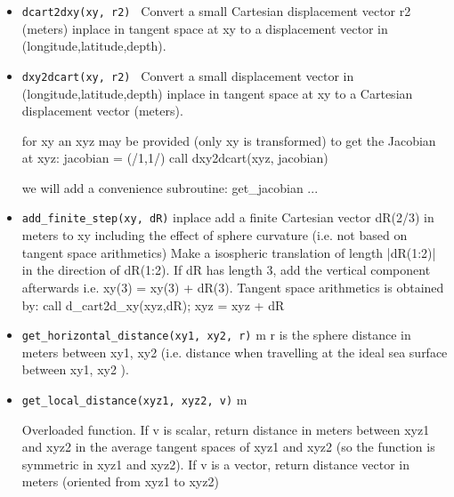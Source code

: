 \begin{itemize}

    \item {\tt dcart2dxy(xy, r2) } Convert a small Cartesian displacement vector r2 (meters)
           inplace in tangent space at xy to a displacement vector in (longitude,latitude,depth).

    \item {\tt dxy2dcart(xy, r2) } Convert a small displacement vector in (longitude,latitude,depth)
           inplace in tangent space at xy to a Cartesian displacement vector (meters).


      
for xy an xyz may be provided (only xy is transformed)
to get the Jacobian at xyz: \newline
jacobian = (/1,1/) \newline
call dxy2dcart(xyz, jacobian)\newline

we will add a convenience subroutine: get\_jacobian ...

    \item {\tt add\_finite\_step(xy, dR)} inplace add a finite
           Cartesian vector dR(2/3) in meters to xy including the 
           effect of sphere curvature (i.e. not based on tangent space arithmetics)
           Make a isospheric translation of length |dR(1:2)| in the direction
           of dR(1:2). If dR has length 3, add the vertical component afterwards
           i.e. xy(3) = xy(3) + dR(3). 
           Tangent space arithmetics is obtained by: \newline
           call d\_cart2d\_xy(xyz,dR);\newline
           xyz = xyz + dR   \newline
 \item {\tt get\_horizontal\_distance(xy1, xy2, r)} m \newline
   r is the sphere distance in meters between xy1, xy2 (i.e. distance when travelling at the ideal sea surface
   between xy1, xy2 ).

 \item {\tt get\_local\_distance(xyz1, xyz2, v)}    m \newline

   Overloaded function.
   If v is scalar, return distance in meters between xyz1 and xyz2 in the average tangent spaces of xyz1 and xyz2
   (so the function is symmetric in xyz1 and xyz2).
   If v is a vector, return distance vector in meters (oriented from xyz1 to xyz2)

\end{itemize}

